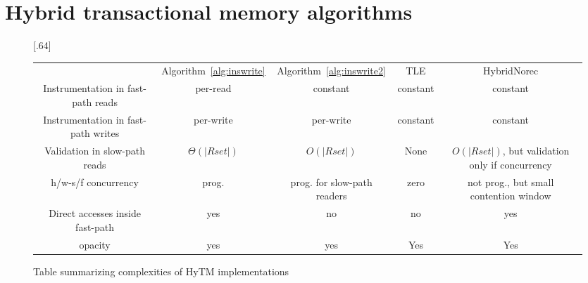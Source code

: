 \section{Hybrid transactional memory algorithms}\label{sec:hytmalgos}
%
\begin{figure*}[!t]
      
     \scalebox{.64}[.64]{
     \begin{tabularx}{\textwidth}{c|c|c|c|c}
	~~~~~ & Algorithm~\ref{alg:inswrite} & Algorithm~\ref{alg:inswrite2} & TLE & HybridNorec\\ 
	Instrumentation in fast-path reads & per-read & constant & constant & constant \\ 
	Instrumentation in fast-path writes & per-write & per-write & constant & constant \\ 
	Validation in slow-path reads & $\Theta(|Rset|)$ & $O(|Rset|)$ & None & $O(|Rset|)$, but validation only if concurrency \\ 
	h/w-s/f concurrency & prog. & prog. for slow-path readers & zero & not prog., but small contention window \\ 
	Direct accesses inside fast-path & yes & no & no & yes \\ 
	opacity & yes & yes & Yes & Yes 
   \end{tabularx}
\caption{Table summarizing complexities of HyTM implementations}\label{fig:main}    
}
\end{figure*}
%

%
